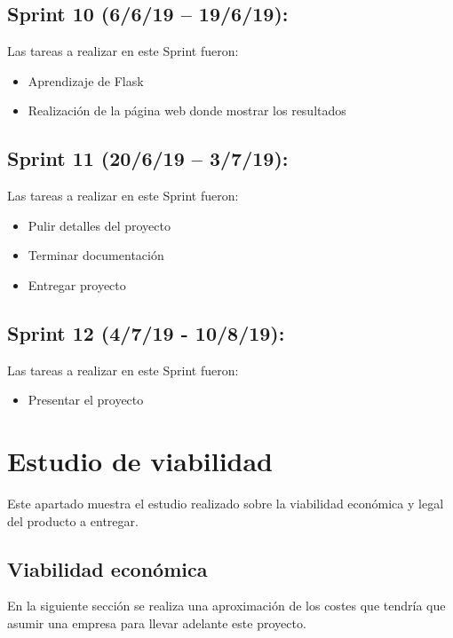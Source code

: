 \subsection{Sprint 10 (6/6/19 – 19/6/19):}

Las tareas a realizar en este Sprint fueron:
\begin{itemize}
    \item Aprendizaje de Flask
    \item Realización de la página web donde mostrar los resultados
\end{itemize}

\subsection{Sprint 11 (20/6/19 – 3/7/19):}

Las tareas a realizar en este Sprint fueron:
\begin{itemize}
    \item Pulir detalles del proyecto
    \item Terminar documentación 
    \item Entregar proyecto
\end{itemize}

\subsection{Sprint 12 (4/7/19 - 10/8/19):}

Las tareas a realizar en este Sprint fueron:
\begin{itemize}
    \item Presentar el proyecto
\end{itemize}



\section{Estudio de viabilidad}

Este apartado muestra el estudio realizado sobre la viabilidad económica y legal del producto a entregar.

\subsection{Viabilidad económica}

En la siguiente sección se realiza una aproximación de los costes que tendría que asumir una empresa para llevar adelante este proyecto.

